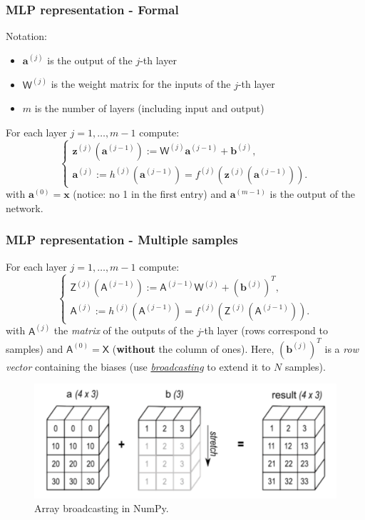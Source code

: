 \documentclass{beamer}
\begin{document}
	\begin{frame}
		\frametitle{MLP representation - Formal}
		Notation: 
		\begin{itemize}
			\item $\bm{a}^{(j)}$ is the output of the $j$-th layer
			\item $\mathsf{W}^{(j)}$ is the weight matrix for the inputs of the $j$-th layer
			\item $m$ is the number of layers (including input and output)
		\end{itemize}
				
		\vspace{5mm}
				
		For each layer $j = 1, \dots, m-1$ compute:
		\begin{equation*}
			\begin{cases}
				\bm{z}^{(j)}(\bm{a}^{(j-1)}) := \mathsf{W}^{(j)} \bm{a}^{(j-1)} + \bm{b}^{(j)},\\
				\bm{a}^{(j)} := h^{(j)}(\bm{a}^{(j-1)}) = f^{(j)}(\bm{z}^{(j)}(\bm{a}^{(j-1)})).
			\end{cases}
		\end{equation*}
		with 
		$\bm{a}^{(0)} = \bm{x}$ (notice: no 1 in the first entry) and $\bm{a}^{(m-1)}$ is the output of the network.

	\end{frame}

	\begin{frame}
		\frametitle{MLP representation - Multiple samples}
		For each layer $j = 1, \dots, m-1$ compute:
		\begin{equation*}
			\begin{cases}
				\mathsf{Z}^{(j)}(\mathsf{A}^{(j-1)}) := \mathsf{A}^{(j-1)}\mathsf{W}^{(j)}  + (\bm{b}^{(j)})^T,\\
				\mathsf{A}^{(j)} := h^{(j)}(\mathsf{A}^{(j-1)}) = f^{(j)}(\mathsf{Z}^{(j)}(\mathsf{A}^{(j-1)})).
			\end{cases}
		\end{equation*}
		with $\mathsf{A}^{(j)}$ the \textit{matrix} of the outputs of the $j$-th layer (rows correspond to samples) and $\mathsf{A}^{(0)} = \mathsf{X}$ (\textbf{without} the column of ones). Here, $(\bm{b}^{(j)})^T$ is a \textit{row vector} containing the biases (use \href{https://numpy.org/doc/stable/user/basics.broadcasting.html}{\textit{broadcasting}} to extend it to $N$ samples).
		
		\begin{figure}
			\centering
			\includegraphics[scale=0.3]{images/broadcasting.png}
			\caption{Array broadcasting in NumPy.}
			\label{fig:broadcasting}
		\end{figure}
		
	\end{frame}
\end{document}
